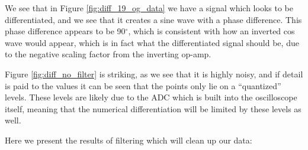 We see that in Figure \ref{fig:diff_19_og_data} we have a signal which looks to be differentiated, and we see that it creates a sine wave with a phase difference. This phase difference appears to be 90$^\circ$, which is consistent with how an inverted cos wave would appear, which is in fact what the differentiated signal should be, due to the negative scaling factor from the inverting op-amp. 



Figure \ref{fig:diff_no_filter} is striking, as we see that it is highly noisy, and if detail is paid to the values it can be seen that the points only lie on a ``quantized'' levels. These levels are likely due to the ADC which is built into the oscilloscope itself, meaning that the numerical differentiation will be limited by these levels as well.\newline

Here we present the results of filtering which will clean up our data:

